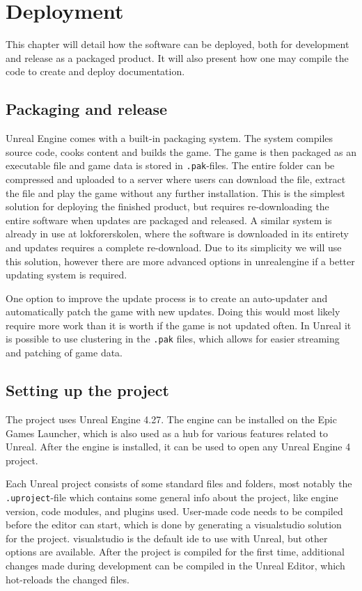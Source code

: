 \chapter{Deployment}

This chapter will detail how the software can be deployed, both for development and release as a packaged product. It will also present how one may compile the code to create and deploy documentation. 

\section{Packaging and release}

Unreal Engine comes with a built-in \gls{packaging} system. The system compiles source code, cooks content and builds the game. The game is then packaged as an executable file and game data is stored in \verb|.pak|-files. The entire folder can be compressed and uploaded to a server where users can download the file, extract the file and play the game without any further installation. This is the simplest solution for deploying the finished product, but requires re-downloading the entire software when updates are packaged and released. A similar system is already in use at \Gls{lokforerskolen}, where the software is downloaded in its entirety and updates requires a complete re-download. Due to its simplicity we will use this solution, however there are more advanced options in \Gls{unrealengine} if a better updating system is required. 

One option to improve the update process is to create an auto-updater and automatically patch the game with new updates. Doing this would most likely require more work than it is worth if the game is not updated often. In Unreal it is possible to use clustering in the \verb|.pak| files, which allows for easier streaming and patching of game data. 

\section{Setting up the project}

The project uses Unreal Engine 4.27. The engine can be installed on the Epic Games Launcher, which is also used as a hub for various features related to Unreal. After the engine is installed, it can be used to open any Unreal Engine 4 project. 

Each Unreal project consists of some standard files and folders, most notably the \verb|.uproject|-file which contains some general info about the project, like engine version, code modules, and plugins used. User-made \cpp code needs to be compiled before the editor can start, which is done by generating a \Gls{visualstudio} \gls{solution} for the project. \Gls{visualstudio} is the default \acrshort{ide} to use with Unreal, but other options are available. After the project is compiled for the first time, additional changes made during development can be compiled in the Unreal Editor, which hot-reloads the changed files. 

